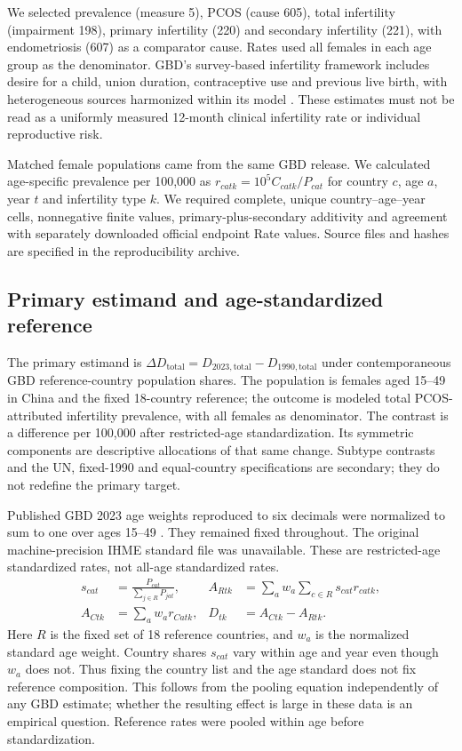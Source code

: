 \documentclass[11pt,a4paper]{article}
\begin{document}
We selected prevalence (measure 5), PCOS (cause 605), total infertility (impairment 198), primary infertility (220) and secondary infertility (221), with endometriosis (607) as a comparator cause. Rates used all females in each age group as the denominator. GBD's survey-based infertility framework includes desire for a child, union duration, contraceptive use and previous live birth, with heterogeneous sources harmonized within its model \citep{gbd}. These estimates must not be read as a uniformly measured 12-month clinical infertility rate or individual reproductive risk.

Matched female populations came from the same GBD release. We calculated age-specific prevalence per 100,000 as $r_{catk}=10^5 C_{catk}/P_{cat}$ for country $c$, age $a$, year $t$ and infertility type $k$. We required complete, unique country--age--year cells, nonnegative finite values, primary-plus-secondary additivity and agreement with separately downloaded official endpoint Rate values. Source files and hashes are specified in the reproducibility archive.

\subsection{Primary estimand and age-standardized reference}
The primary estimand is $\Delta D_{\mathrm{total}}=D_{2023,\mathrm{total}}-D_{1990,\mathrm{total}}$ under contemporaneous GBD reference-country population shares. The population is females aged 15--49 in China and the fixed 18-country reference; the outcome is modeled total PCOS-attributed infertility prevalence, with all females as denominator. The contrast is a difference per 100,000 after restricted-age standardization. Its symmetric components are descriptive allocations of that same change. Subtype contrasts and the UN, fixed-1990 and equal-country specifications are secondary; they do not redefine the primary target.

Published GBD 2023 age weights reproduced to six decimals were normalized to sum to one over ages 15--49 \citep{chen}. They remained fixed throughout. The original machine-precision IHME standard file was unavailable. These are restricted-age standardized rates, not all-age standardized rates.
\begin{align}
 s_{cat}&=\frac{P_{cat}}{\sum_{j\in R}P_{jat}}, &
 A_{Rtk}&=\sum_a w_a\sum_{c\in R}s_{cat}r_{catk},\\
 A_{Ctk}&=\sum_a w_ar_{Catk}, &D_{tk}&=A_{Ctk}-A_{Rtk}.
\end{align}
Here $R$ is the fixed set of 18 reference countries, and $w_a$ is the normalized standard age weight. Country shares $s_{cat}$ vary within age and year even though $w_a$ does not. Thus fixing the country list and the age standard does not fix reference composition. This follows from the pooling equation independently of any GBD estimate; whether the resulting effect is large in these data is an empirical question. Reference rates were pooled within age before standardization.
\end{document}
